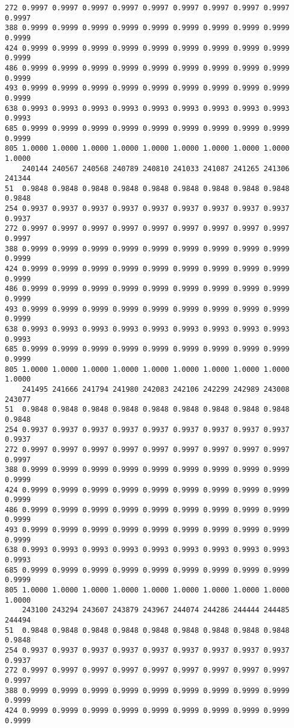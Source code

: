 \documentclass[
]{report}
\begin{document}
\begin{verbatim}
272 0.9997 0.9997 0.9997 0.9997 0.9997 0.9997 0.9997 0.9997 0.9997 0.9997
388 0.9999 0.9999 0.9999 0.9999 0.9999 0.9999 0.9999 0.9999 0.9999 0.9999
424 0.9999 0.9999 0.9999 0.9999 0.9999 0.9999 0.9999 0.9999 0.9999 0.9999
486 0.9999 0.9999 0.9999 0.9999 0.9999 0.9999 0.9999 0.9999 0.9999 0.9999
493 0.9999 0.9999 0.9999 0.9999 0.9999 0.9999 0.9999 0.9999 0.9999 0.9999
638 0.9993 0.9993 0.9993 0.9993 0.9993 0.9993 0.9993 0.9993 0.9993 0.9993
685 0.9999 0.9999 0.9999 0.9999 0.9999 0.9999 0.9999 0.9999 0.9999 0.9999
805 1.0000 1.0000 1.0000 1.0000 1.0000 1.0000 1.0000 1.0000 1.0000 1.0000
    240144 240567 240568 240789 240810 241033 241087 241265 241306 241344
51  0.9848 0.9848 0.9848 0.9848 0.9848 0.9848 0.9848 0.9848 0.9848 0.9848
254 0.9937 0.9937 0.9937 0.9937 0.9937 0.9937 0.9937 0.9937 0.9937 0.9937
272 0.9997 0.9997 0.9997 0.9997 0.9997 0.9997 0.9997 0.9997 0.9997 0.9997
388 0.9999 0.9999 0.9999 0.9999 0.9999 0.9999 0.9999 0.9999 0.9999 0.9999
424 0.9999 0.9999 0.9999 0.9999 0.9999 0.9999 0.9999 0.9999 0.9999 0.9999
486 0.9999 0.9999 0.9999 0.9999 0.9999 0.9999 0.9999 0.9999 0.9999 0.9999
493 0.9999 0.9999 0.9999 0.9999 0.9999 0.9999 0.9999 0.9999 0.9999 0.9999
638 0.9993 0.9993 0.9993 0.9993 0.9993 0.9993 0.9993 0.9993 0.9993 0.9993
685 0.9999 0.9999 0.9999 0.9999 0.9999 0.9999 0.9999 0.9999 0.9999 0.9999
805 1.0000 1.0000 1.0000 1.0000 1.0000 1.0000 1.0000 1.0000 1.0000 1.0000
    241495 241666 241794 241980 242083 242106 242299 242989 243008 243077
51  0.9848 0.9848 0.9848 0.9848 0.9848 0.9848 0.9848 0.9848 0.9848 0.9848
254 0.9937 0.9937 0.9937 0.9937 0.9937 0.9937 0.9937 0.9937 0.9937 0.9937
272 0.9997 0.9997 0.9997 0.9997 0.9997 0.9997 0.9997 0.9997 0.9997 0.9997
388 0.9999 0.9999 0.9999 0.9999 0.9999 0.9999 0.9999 0.9999 0.9999 0.9999
424 0.9999 0.9999 0.9999 0.9999 0.9999 0.9999 0.9999 0.9999 0.9999 0.9999
486 0.9999 0.9999 0.9999 0.9999 0.9999 0.9999 0.9999 0.9999 0.9999 0.9999
493 0.9999 0.9999 0.9999 0.9999 0.9999 0.9999 0.9999 0.9999 0.9999 0.9999
638 0.9993 0.9993 0.9993 0.9993 0.9993 0.9993 0.9993 0.9993 0.9993 0.9993
685 0.9999 0.9999 0.9999 0.9999 0.9999 0.9999 0.9999 0.9999 0.9999 0.9999
805 1.0000 1.0000 1.0000 1.0000 1.0000 1.0000 1.0000 1.0000 1.0000 1.0000
    243100 243294 243607 243879 243967 244074 244286 244444 244485 244494
51  0.9848 0.9848 0.9848 0.9848 0.9848 0.9848 0.9848 0.9848 0.9848 0.9848
254 0.9937 0.9937 0.9937 0.9937 0.9937 0.9937 0.9937 0.9937 0.9937 0.9937
272 0.9997 0.9997 0.9997 0.9997 0.9997 0.9997 0.9997 0.9997 0.9997 0.9997
388 0.9999 0.9999 0.9999 0.9999 0.9999 0.9999 0.9999 0.9999 0.9999 0.9999
424 0.9999 0.9999 0.9999 0.9999 0.9999 0.9999 0.9999 0.9999 0.9999 0.9999

\end{verbatim}
\end{document}

